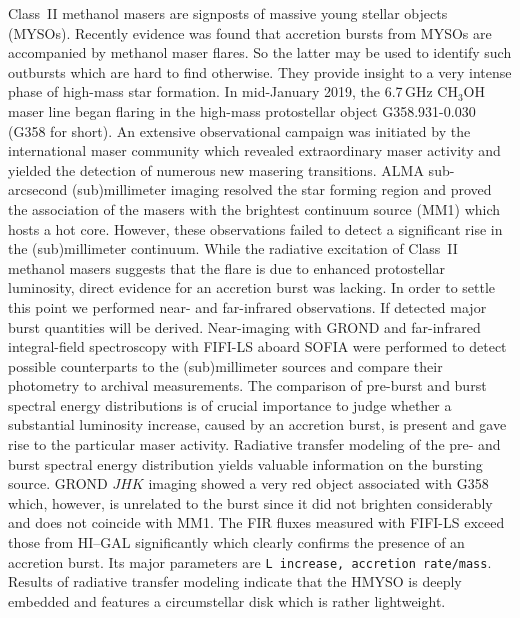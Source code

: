 \documentclass[longauth,usenatbib]{aa}
\begin{document}
  \abstract
    {
   Class~II methanol masers are signposts of massive young stellar objects (MYSOs). Recently evidence was found that accretion bursts from MYSOs are accompanied by methanol maser flares. So the latter may be used to identify such outbursts which are hard to find otherwise. They provide insight to a very intense phase of high-mass star formation.
   }
   {
   In mid-January 2019, the 6.7\,GHz CH$_3$OH maser line began flaring in the high-mass protostellar object G358.931-0.030 (G358 for short). An extensive observational campaign was initiated by the international maser community which revealed extraordinary maser activity and yielded the detection of numerous new masering transitions. ALMA sub-arcsecond (sub)millimeter imaging resolved the star forming region and proved the association of the masers with the brightest continuum source (MM1) which hosts a hot core. However, these observations failed to detect a significant rise in the (sub)millimeter continuum. While the radiative excitation of Class~II methanol masers suggests that the flare is due to enhanced protostellar luminosity, direct evidence for an accretion burst was lacking. In order to settle this point we performed near- and far-infrared observations. If detected major burst quantities will be derived.
   }
   {
    Near-imaging with GROND and far-infrared integral-field spectroscopy with FIFI-LS aboard SOFIA were performed to detect possible counterparts to the (sub)millimeter sources and compare their photometry to archival measurements. The comparison of pre-burst and burst spectral energy distributions is of crucial importance to judge whether a substantial luminosity increase, caused by an accretion burst, is present and gave rise to the particular maser activity. Radiative transfer modeling of the pre- and burst spectral energy distribution yields valuable information on the bursting source.
   }
   {
   GROND $JHK$ imaging showed a very red object associated with G358 which, however, is unrelated to the burst since it did not brighten considerably and does not coincide with MM1.
   The FIR fluxes measured with FIFI-LS exceed those from HI--GAL significantly which clearly confirms the presence of an accretion burst. Its major parameters are {\tt L increase, accretion rate/mass}. Results of radiative transfer modeling indicate that the HMYSO is deeply embedded and features a circumstellar disk which is rather lightweight.
   }
\end{document}
